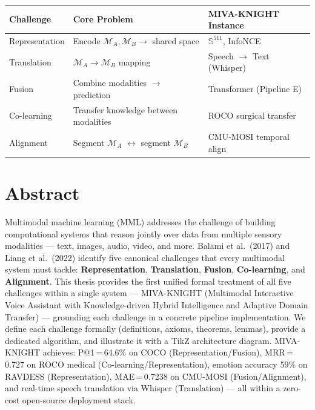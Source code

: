 \documentclass[12pt,a4paper]{article}
\theoremstyle{definition}
\theoremstyle{plain}
\theoremstyle{remark}
\newcommand{\Sph}{\mathbb{S}}
\newcommand{\MA}{\mathcal{M}_A}
\newcommand{\MB}{\mathcal{M}_B}
\begin{document}
\begin{titlepage}
\vfill
\begin{center}
\begin{tabular}{lll}
\toprule
\textbf{Challenge} & \textbf{Core Problem} & \textbf{MIVA-KNIGHT Instance} \\
\midrule
Representation & Encode $\MA, \MB \to$ shared space & $\Sph^{511}$, InfoNCE \\
Translation & $\MA \to \MB$ mapping & Speech $\to$ Text (Whisper) \\
Fusion & Combine modalities $\to$ prediction & Transformer (Pipeline E) \\
Co-learning & Transfer knowledge between modalities & ROCO surgical transfer \\
Alignment & Segment $\MA$ $\leftrightarrow$ segment $\MB$ & CMU-MOSI temporal align \\
\bottomrule
\end{tabular}
\end{center}
\vspace{1.5cm}
\end{titlepage}

\tableofcontents
\newpage

\section{Abstract}

Multimodal machine learning (MML) addresses the challenge of building computational systems that reason jointly over data from multiple sensory modalities — text, images, audio, video, and more. Balami et al.\ (2017) and Liang et al.\ (2022) identify five canonical challenges that every multimodal system must tackle: \textbf{Representation}, \textbf{Translation}, \textbf{Fusion}, \textbf{Co-learning}, and \textbf{Alignment}. This thesis provides the first unified formal treatment of all five challenges within a single system — MIVA-KNIGHT (Multimodal Interactive Voice Assistant with Knowledge-driven Hybrid Intelligence and Adaptive Domain Transfer) — grounding each challenge in a concrete pipeline implementation. We define each challenge formally (definitions, axioms, theorems, lemmas), provide a dedicated algorithm, and illustrate it with a TikZ architecture diagram. MIVA-KNIGHT achieves: P@1\,=\,64.6\% on COCO (Representation/Fusion), MRR\,=\,0.727 on ROCO medical (Co-learning/Representation), emotion accuracy 59\% on RAVDESS (Representation), MAE\,=\,0.7238 on CMU-MOSI (Fusion/Alignment), and real-time speech translation via Whisper (Translation) — all within a zero-cost open-source deployment stack.
\end{document}

